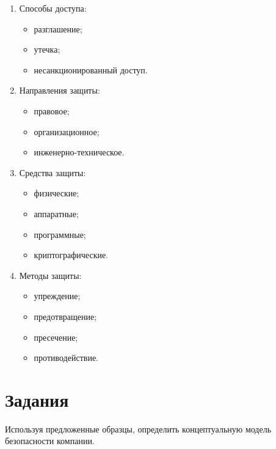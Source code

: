 \begin{minipage}{0.45\textwidth}
  \begin{enumerate}
    \setcounter{notes}{5}
    \item Способы доступа:
      \begin{itemize}
    	\item разглашение;
    	\item утечка;
    	\item несанкционированный доступ.
      \end{itemize}
    \item Направления защиты:
      \begin{itemize}
    	\item правовое;
    	\item организационное;
    	\item инженерно-техническое.
      \end{itemize}
    \item Средства защиты:
      \begin{itemize}
    	\item физические;
    	\item аппаратные;
    	\item программные;
    	\item криптографические.
      \end{itemize}
    \item Методы защиты:
      \begin{itemize}
    	\item упреждение;
    	\item предотвращение;
    	\item пресечение;
    	\item противодействие.
      \end{itemize}
  \end{enumerate}
\end{minipage}

\section{Задания}\label{sect3_b}
%
Используя предложенные образцы, определить концептуальную модель
безопасности компании.

